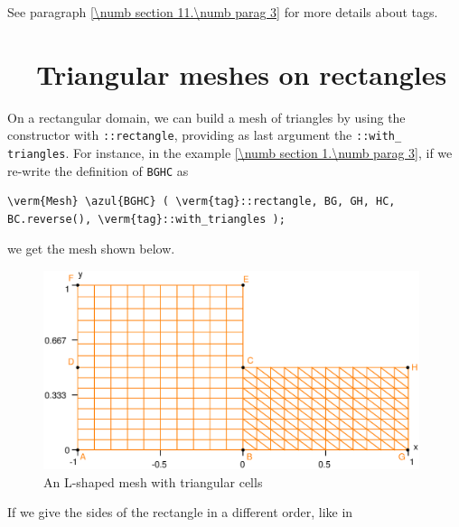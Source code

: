 See paragraph \ref{\numb section 11.\numb parag 3} for more details about tags.


\section{~~Triangular meshes on rectangles}\label{\numb section 2.\numb parag 2}

On a rectangular domain, we can build a mesh of triangles by using the {\small\tt {}}
constructor with {\small\tt {}::rectangle}, providing as last argument the
{\small\tt {}::with\_\,triangles}.
For instance, in the example \ref{\numb section 1.\numb parag 3},
if we re-write the definition of {\small\tt BGHC} as

\begin{Verbatim}[commandchars=\\\{\},formatcom=\small\tt,baselinestretch=0.94]
   \verm{Mesh} \azul{BGHC} ( \verm{tag}::rectangle, BG, GH, HC, BC.reverse(), \verm{tag}::with_triangles );
\end{Verbatim}

\noindent we get the mesh shown below.

\begin{figure}[ht] \centering
  \includegraphics[width=110mm]{L-shaped-tri}
  \caption{An L-shaped mesh with triangular cells}
  \label{\numb section 2.\numb fig 2}
\end{figure}

If we give the sides of the rectangle in a different order, like in

